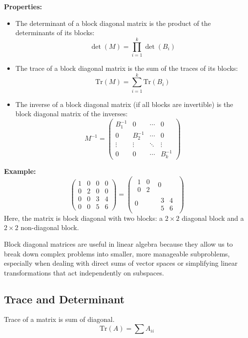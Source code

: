 \documentclass[12pt, a4paper]{report}
\begin{document}
\textbf{Properties:}
\begin{itemize}
    \item The determinant of a block diagonal matrix is the product of the determinants of its blocks:
    $$
    \det(M) = \prod_{i=1}^k \det(B_i)
    $$
    \item The trace of a block diagonal matrix is the sum of the traces of its blocks:
    $$
    \text{Tr}(M) = \sum_{i=1}^k \text{Tr}(B_i)
    $$
    \item The inverse of a block diagonal matrix (if all blocks are invertible) is the block diagonal matrix of the inverses:
    $$
    M^{-1} = \begin{pmatrix}
    B_1^{-1} & 0 & \cdots & 0 \\
    0 & B_2^{-1} & \cdots & 0 \\
    \vdots & \vdots & \ddots & \vdots \\
    0 & 0 & \cdots & B_k^{-1}
    \end{pmatrix}
    $$
\end{itemize}

\textbf{Example:}
$$
\begin{pmatrix}
1 & 0 & 0 & 0 \\
0 & 2 & 0 & 0 \\
0 & 0 & 3 & 4 \\
0 & 0 & 5 & 6
\end{pmatrix}
=\begin{pmatrix}
\begin{matrix}1 & 0 \\ 0 & 2\end{matrix} & 0 \\
0 & \begin{matrix}3 & 4 \\ 5 & 6\end{matrix}
\end{pmatrix}
$$
Here, the matrix is block diagonal with two blocks: a $2\times2$ diagonal block and a $2\times2$ non-diagonal block.

Block diagonal matrices are useful in linear algebra because they allow us to break down complex problems into smaller, more manageable subproblems, especially when dealing with direct sums of vector spaces or simplifying linear transformations that act independently on subspaces.

\subsection{Trace and Determinant}
Trace of a matrix is sum of diagonal.
$$
\text{Tr}(A) = \sum A_{ii}
$$
\end{document}
